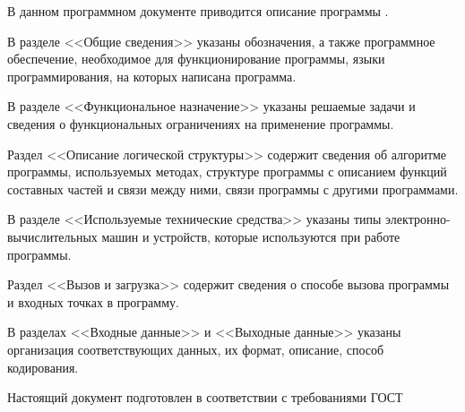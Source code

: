 \newpage\annotation
{}


В данном программном документе приводится описание программы \productnamesecond.

В разделе <<Общие сведения>> указаны обозначения, а также программное обеспечение, необходимое для функционирование программы, языки программирования, на которых написана программа.

В разделе <<Функциональное назначение>> указаны решаемые задачи и сведения о функциональных ограничениях на применение программы.

Раздел <<Описание логической структуры>> содержит сведения об алгоритме программы, используемых методах, структуре программы с описанием функций составных частей и связи между ними, связи программы с другими программами.

В разделе <<Используемые технические средства>> указаны типы электронно-вычислительных машин и устройств, которые используются при работе программы.

Раздел <<Вызов и загрузка>> содержит сведения о способе вызова программы и входных точках в программу.

В разделах <<Входные данные>> и <<Выходные данные>> указаны организация соответствующих данных, их формат, описание, способ кодирования.

Настоящий документ подготовлен в соответствии с требованиями ГОСТ~\cite{gost19402}
